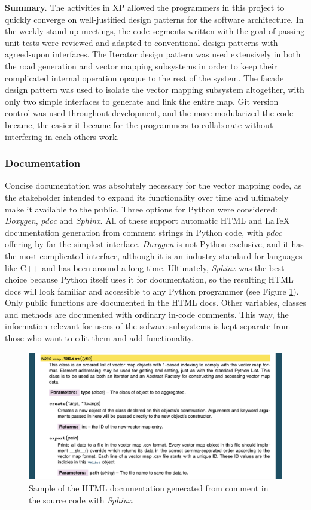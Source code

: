 \documentclass[12pt,twoside]{article}
\begin{document}
\textbf{Summary.}
The activities in XP allowed the programmers in this project to quickly converge on well-justified design patterns for the software architecture. In the weekly stand-up meetings, the code segments written with the goal of passing unit tests were reviewed and adapted to conventional design patterns with agreed-upon interfaces. The Iterator design pattern was used extensively in both the road generation and vector mapping subsystems in order to keep their complicated internal operation opaque to the rest of the system. The facade design pattern was used to isolate the vector mapping subsystem altogether, with only two simple interfaces to generate and link the entire map. Git version control was used throughout development, and the more modularized the code became, the easier it became for the programmers to collaborate without interfering in each others work.

\subsubsection{Documentation}
Concise documentation was absolutely necessary for the vector mapping code, as the stakeholder intended to expand its functionality over time and ultimately make it available to the public. Three options for Python were considered: \textit{Doxygen}, \textit{pdoc} and \textit{Sphinx}. All of these support automatic HTML and LaTeX documentation generation from comment strings in Python code, with \textit{pdoc} offering by far the simplest interface. \textit{Doxygen} is not Python-exclusive, and it has the most complicated interface, although it is an industry standard for languages like C++ and has been around a long time. Ultimately, \textit{Sphinx} was the best choice because Python itself uses it for documentation, so the resulting HTML docs will look familiar and accessible to any Python programmer (see Figure \ref{fig:doc}). Only public functions are documented in the HTML docs. Other variables, classes and methods are documented with ordinary in-code comments. This way, the information relevant for users of the sofware subsystems is kept separate from those who want to edit them and add functionality.

\begin{figure}[ht]
    \centering
    \includegraphics[width=16cm,keepaspectratio]{doc.png}
    \caption{Sample of the HTML documentation generated from comment in the source code with \textit{Sphinx}.}
    \label{fig:doc}
\end{figure}
\end{document}
